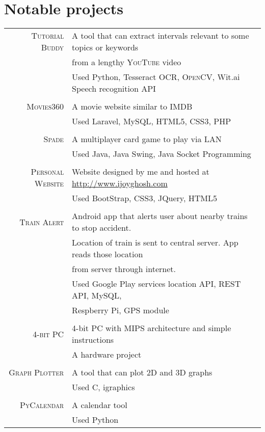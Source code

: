 \documentclass[a4paper,10pt]{article}
\begin{document}
\section{Notable projects}
\begin{longtable}{rl}

  \textsc{Tutorial Buddy} & A tool that can extract intervals relevant to some topics or keywords \\
  & from a lengthy \textsc{YouTube} video \\
  & Used Python, Tesseract \textsc{OCR}, \textsc{OpenCV}, Wit.ai Speech recognition API \\
  
  & \\
  
  \textsc{Movies360} & A movie website similar to \textsc{IMDB} \\
  & Used Laravel, My\textsc{SQL}, \textsc{HTML5}, \textsc{CSS3}, \textsc{PHP} \\

  & \\

  \textsc{Spade} & A multiplayer card game to play via \textsc{LAN} \\
  & Used Java, Java Swing, Java Socket Programming\\


  & \\

  \textsc{Personal Website} & Website designed by me and hosted at \href{http://www.ijoyghosh.com}{http://www.ijoyghosh.com} \\
  & Used BootStrap, CSS3, JQuery, HTML5 \\

  & \\

  \textsc{Train Alert} & Android app that alerts user about nearby trains to stop accident. \\
  & Location of train is sent to central server. App reads those location \\
  & from server through internet. \\
  & Used Google Play services location API, \textsc{REST} API, My\textsc{SQL}, \\
  & Respberry Pi, GPS module \\
  
  & \\
  
  \textsc{4-bit PC} & 4-bit PC with MIPS architecture and simple instructions \\
  & A hardware project \\
  
  & \\

  \textsc{Graph Plotter} & A tool that can plot \textsc{2D} and \textsc{3D} graphs \\
  & Used C, igraphics \\

  & \\

  \textsc{PyCalendar} & A calendar tool \\
  & Used Python

\end{longtable}
\end{document}
